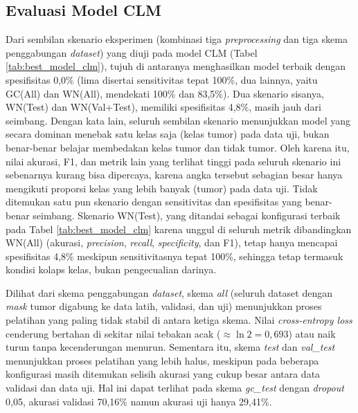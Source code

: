 \subsection{Evaluasi Model CLM}
\label{subsec:clm}

Dari sembilan skenario eksperimen (kombinasi tiga \textit{preprocessing} dan tiga skema penggabungan \textit{dataset}) yang diuji pada model CLM (Tabel \ref{tab:best_model_clm}), tujuh di antaranya menghasilkan model terbaik dengan spesifisitas 0,0\% (lima disertai sensitivitas tepat 100\%, dua lainnya, yaitu GC(All) dan WN(All), mendekati 100\% dan 83,5\%). Dua skenario sisanya, WN(Test) dan WN(Val+Test), memiliki spesifisitas 4,8\%, masih jauh dari seimbang. Dengan kata lain, seluruh sembilan skenario menunjukkan model yang secara dominan menebak satu kelas saja (kelas tumor) pada data uji, bukan benar-benar belajar membedakan kelas tumor dan tidak tumor. Oleh karena itu, nilai akurasi, F1, dan metrik lain yang terlihat tinggi pada seluruh skenario ini sebenarnya kurang bisa dipercaya, karena angka tersebut sebagian besar hanya mengikuti proporsi kelas yang lebih banyak (tumor) pada data uji. Tidak ditemukan satu pun skenario dengan sensitivitas dan spesifisitas yang benar-benar seimbang. Skenario WN(Test), yang ditandai sebagai konfigurasi terbaik pada Tabel \ref{tab:best_model_clm} karena unggul di seluruh metrik dibandingkan WN(All) (akurasi, \textit{precision}, \textit{recall}, \textit{specificity}, dan F1), tetap hanya mencapai spesifisitas 4,8\% meskipun sensitivitasnya tepat 100\%, sehingga tetap termasuk kondisi kolaps kelas, bukan pengecualian darinya.

Dilihat dari skema penggabungan \textit{dataset}, skema \textit{all} (seluruh dataset dengan \textit{mask} tumor digabung ke data latih, validasi, dan uji) menunjukkan proses pelatihan yang paling tidak stabil di antara ketiga skema. Nilai \textit{cross-entropy loss} cenderung bertahan di sekitar nilai tebakan acak ($\approx \ln 2 = 0{,}693$) atau naik turun tanpa kecenderungan menurun. Sementara itu, skema \textit{test} dan \textit{val\_test} menunjukkan proses pelatihan yang lebih halus, meskipun pada beberapa konfigurasi masih ditemukan selisih akurasi yang cukup besar antara data validasi dan data uji. Hal ini dapat terlihat pada skema \textit{gc\_test} dengan \textit{dropout} 0,05, akurasi validasi 70,16\% namun akurasi uji hanya 29,41\%.

